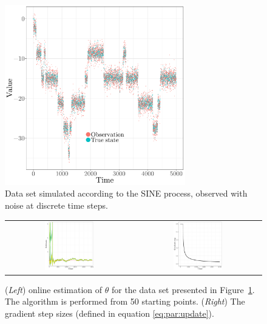 \documentclass{article}
\newcommand{\parvec}{\theta}
\begin{document}
\begin{figure}
\centering
\includegraphics[width = 0.7\textwidth]{SINE_data.pdf}
\caption{\label{fig:data} Data set simulated according to the SINE process, observed with noise at discrete time steps.}
\end{figure}
\begin{figure}
\centering
\begin{tabular}{cc}
\includegraphics[width = 0.4\textwidth]{oneObs_severalStarts.pdf}&
\includegraphics[width = 0.4\textwidth]{gradient_steps.pdf}
\end{tabular} 
\caption{\label{fig:1obs:50start}(\textit{Left}) online estimation of $\parvec$ for the data set presented in Figure~\ref{fig:data}. The algorithm is performed from 50 starting points. (\textit{Right}) The gradient step sizes (defined in equation \eqref{eq:par:update}).}
\end{figure}
\end{document}
